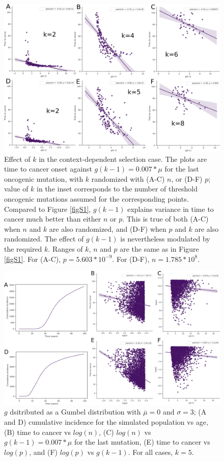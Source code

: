 \documentclass[9pt,twocolumn,twoside]{pnas-new}
\begin{document}
\begin{figure}[tbhp]
	\centering
	\includegraphics[width=.8\linewidth]{fig6.png}
	\caption{Effect of $k$ in the context-dependent selection case. The plots are time to cancer onset against $g(k-1)=0.007*\mu$ for the last oncogenic mutation, with $k$ randomized with (A-C) $n$, or (D-F) $p$; value of $k$ in the inset corresponds to the number of threshold oncogenic mutations assumed for the corresponding points. Compared to Figure \ref{figS1}, $g(k-1)$ explains variance in time to cancer much better than either $n$ or $p$. This is true of both (A-C) when $n$ and $k$ are also randomized, and (D-F) when $p$ and $k$ are also randomized. The effect of $g(k-1)$ is nevertheless modulated by the required $k$. Ranges of $k$, $n$ and $p$ are the same as in Figure \ref{figS1}. For (A-C), $p=5.603*10^{-9}$. For (D-F), $n=1.785*10^{8}$.}
	\label{figS2}
\end{figure}

\begin{figure}[tbhp]
	\centering
	\includegraphics[width=.8\linewidth]{figS3.png}
	\caption{$g$ dsitributed as a Gumbel distribution with $\overline{\mu}=0$ and $\sigma=3$; (A and D) cumulative incidence for the simulated population vs age, (B) time to cancer vs $log(n)$, (C) $log(n)$ vs $g(k-1)=0.007*\mu$ for the last mutation, (E) time to cancer vs $log(p)$, and (F) $log(p)$ vs $g(k-1)$. For all cases, $k=5$.}
	\label{figS3}
\end{figure}
\end{document}
